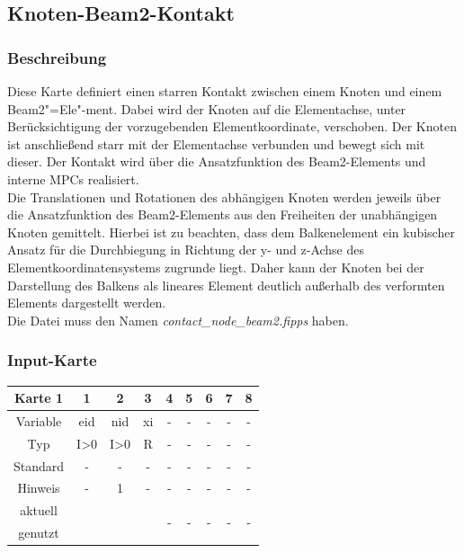 \documentclass[11pt,titlepage,listof=totoc,bibliography=totoc,twoside]{scrreprt}
\begin{document}
{{\subsection{Knoten-Beam2-Kontakt}

\subsubsection{Beschreibung}

Diese Karte definiert einen starren Kontakt zwischen einem Knoten und einem Beam2"=Ele"-ment. Dabei wird der Knoten auf die Elementachse, unter Berücksichtigung der vorzugebenden Elementkoordinate, verschoben. Der Knoten ist anschließend starr mit der Elementachse verbunden und bewegt sich mit dieser. Der Kontakt wird über die Ansatzfunktion des Beam2-Elements und interne MPCs realisiert.\\
Die Translationen und Rotationen des abhängigen Knoten werden jeweils über die Ansatzfunktion des Beam2-Elements aus den Freiheiten der unabhängigen Knoten gemittelt. Hierbei ist zu beachten, dass dem Balkenelement ein kubischer Ansatz für die Durchbiegung in Richtung der y- und z-Achse des Elementkoordinatensystems zugrunde liegt. Daher kann der Knoten bei der Darstellung des Balkens als lineares Element deutlich außerhalb des verformten Elements dargestellt werden.\\
Die Datei muss den Namen \emph{contact\_node\_beam2.fipps} haben.

\subsubsection{Input-Karte}

\begin{table}[htbp]
\centering
\begin{tabularx}{\textwidth}{cCCCCCCCC}
\toprule
Karte 1	& 1		& 2		& 3		& 4		& 5		& 6		& 7		& 8		\\
\midrule
Variable& eid		& nid		& xi		& -		& -		& -		& -		& -		\\
Typ	& I>0		& I>0		& R		& -		& -		& -		& -		& -		\\
Standard& -		& -		& -		& -		& -		& -		& -		& -		\\
Hinweis	& -		& 1		& -		& -		& -		& -		& -		& -		\\
aktuell	& 	& 	& 	& 	& 	& \multirow{2}{*}{-}	& 	& 	\\
genutzt \\
\bottomrule
\end{tabularx}
\end{table}

}}
\end{document}
